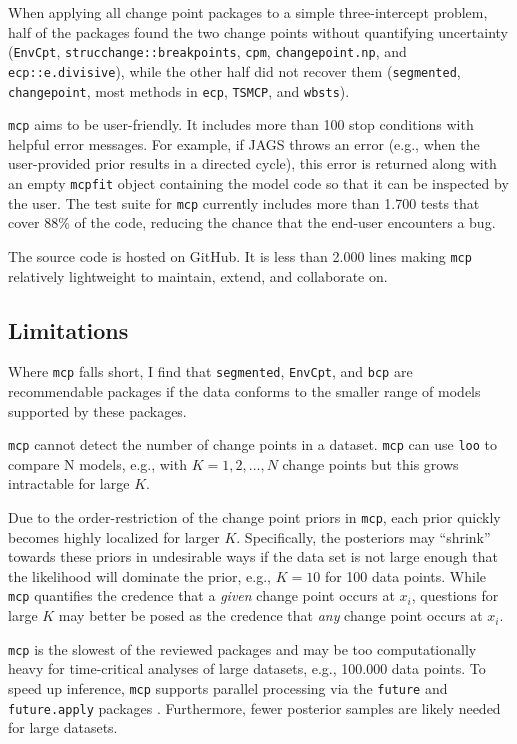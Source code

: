 \documentclass[
  american,
]{article}
\begin{document}
When applying all change point packages to a simple three-intercept problem, half of the packages found the two change points without quantifying uncertainty (\texttt{EnvCpt}, \texttt{strucchange::breakpoints}, \texttt{cpm}, \texttt{changepoint.np}, and \texttt{ecp::e.divisive}), while the other half did not recover them (\texttt{segmented}, \texttt{changepoint}, most methods in \texttt{ecp}, \texttt{TSMCP}, and \texttt{wbsts}).

\texttt{mcp} aims to be user-friendly. It includes more than 100 stop conditions with helpful error messages. For example, if JAGS throws an error (e.g., when the user-provided prior results in a directed cycle), this error is returned along with an empty \texttt{mcpfit} object containing the model code so that it can be inspected by the user. The test suite for \texttt{mcp} currently includes more than 1.700 tests that cover 88\% of the code, reducing the chance that the end-user encounters a bug.

The source code is hosted on GitHub. It is less than 2.000 lines making \texttt{mcp} relatively lightweight to maintain, extend, and collaborate on.

\hypertarget{limitations}{%
\subsection{Limitations}\label{limitations}}

Where \texttt{mcp} falls short, I find that \texttt{segmented}, \texttt{EnvCpt}, and \texttt{bcp} are recommendable packages if the data conforms to the smaller range of models supported by these packages.

\texttt{mcp} cannot detect the number of change points in a dataset. \texttt{mcp} can use \texttt{loo} to compare N models, e.g., with \(K = 1, 2, \ldots, N\) change points but this grows intractable for large \(K\).

Due to the order-restriction of the change point priors in \texttt{mcp}, each prior quickly becomes highly localized for larger \(K\). Specifically, the posteriors may ``shrink'' towards these priors in undesirable ways if the data set is not large enough that the likelihood will dominate the prior, e.g., \(K = 10\) for 100 data points. While \texttt{mcp} quantifies the credence that a \emph{given} change point occurs at \(x_i\), questions for large \(K\) may better be posed as the credence that \emph{any} change point occurs at \(x_i\).

\texttt{mcp} is the slowest of the reviewed packages and may be too computationally heavy for time-critical analyses of large datasets, e.g., 100.000 data points. To speed up inference, \texttt{mcp} supports parallel processing via the \texttt{future} and \texttt{future.apply} packages \citep{bengtsson2019}. Furthermore, fewer posterior samples are likely needed for large datasets.
\end{document}
